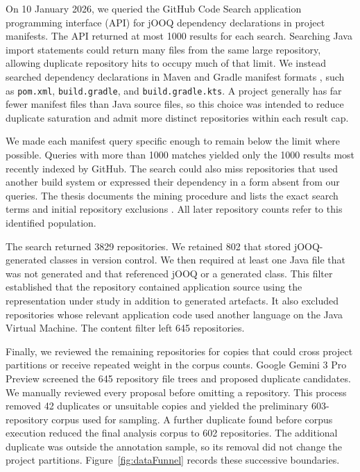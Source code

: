On 10 January 2026, we queried the GitHub Code Search application programming interface (API)  for jOOQ dependency declarations in project manifests. The API returned at most \num{1000} results for each search. Searching Java import statements could return many files from the same large repository, allowing duplicate repository hits to occupy much of that limit. We instead searched dependency declarations in Maven and Gradle manifest formats , such as \texttt{pom.xml}, \texttt{build.gradle}, and \texttt{build.gradle.kts}. A project generally has far fewer manifest files than Java source files, so this choice was intended to reduce duplicate saturation and admit more distinct repositories within each result cap.

We made each manifest query specific enough to remain below the limit where possible. Queries with more than \num{1000} matches yielded only the \num{1000} results most recently indexed by GitHub. The search could also miss repositories that used another build system or expressed their dependency in a form absent from our queries. The thesis documents the mining procedure and lists the exact search terms and initial repository exclusions . All later repository counts refer to this identified population.

The search returned \num{3829} repositories. We retained \num{802} that stored jOOQ-generated classes in version control. We then required at least one Java file that was not generated and that referenced jOOQ or a generated class. This filter established that the repository contained application source using the representation under study in addition to generated artefacts. It also excluded repositories whose relevant application code used another language on the Java Virtual Machine. The content filter left \num{645} repositories.

Finally, we reviewed the remaining repositories for copies that could cross project partitions or receive repeated weight in the corpus counts. Google Gemini 3 Pro Preview  screened the \num{645} repository file trees and proposed duplicate candidates. We manually reviewed every proposal before omitting a repository. This process removed \num{42} duplicates or unsuitable copies and yielded the preliminary \num{603}-repository corpus used for sampling. A further duplicate found before corpus execution reduced the final analysis corpus to \num{602} repositories. The additional duplicate was outside the annotation sample, so its removal did not change the project partitions. Figure~\ref{fig:dataFunnel} records these successive boundaries.

